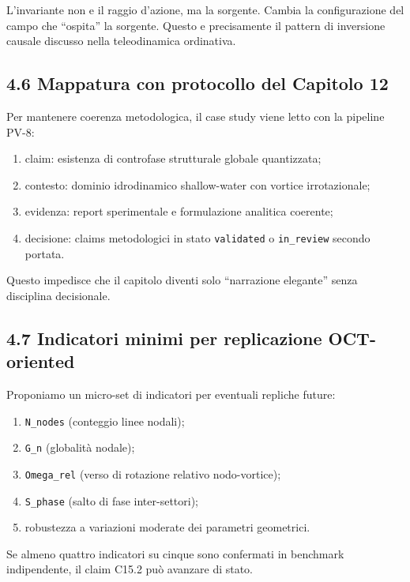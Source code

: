 L'invariante non e il raggio d'azione, ma la sorgente. Cambia la configurazione del campo che ``ospita'' la sorgente. Questo e precisamente il pattern di inversione causale discusso nella teleodinamica ordinativa.

\subsection{4.6 Mappatura con protocollo del Capitolo 12}

Per mantenere coerenza metodologica, il case study viene letto con la pipeline PV-8:

\begin{enumerate}
\def\labelenumi{\arabic{enumi}.}
\tightlist
\item
  claim: esistenza di controfase strutturale globale quantizzata;
\item
  contesto: dominio idrodinamico shallow-water con vortice irrotazionale;
\item
  evidenza: report sperimentale e formulazione analitica coerente;
\item
  decisione: claims metodologici in stato \texttt{validated} o \texttt{in\_review} secondo portata.
\end{enumerate}

Questo impedisce che il capitolo diventi solo ``narrazione elegante'' senza disciplina decisionale.

\subsection{4.7 Indicatori minimi per replicazione OCT-oriented}

Proponiamo un micro-set di indicatori per eventuali repliche future:

\begin{enumerate}
\def\labelenumi{\arabic{enumi}.}
\tightlist
\item
  \texttt{N\_nodes} (conteggio linee nodali);
\item
  \texttt{G\_n} (globalità nodale);
\item
  \texttt{Omega\_rel} (verso di rotazione relativo nodo-vortice);
\item
  \texttt{S\_phase} (salto di fase inter-settori);
\item
  robustezza a variazioni moderate dei parametri geometrici.
\end{enumerate}

Se almeno quattro indicatori su cinque sono confermati in benchmark indipendente, il claim C15.2 può avanzare di stato.

